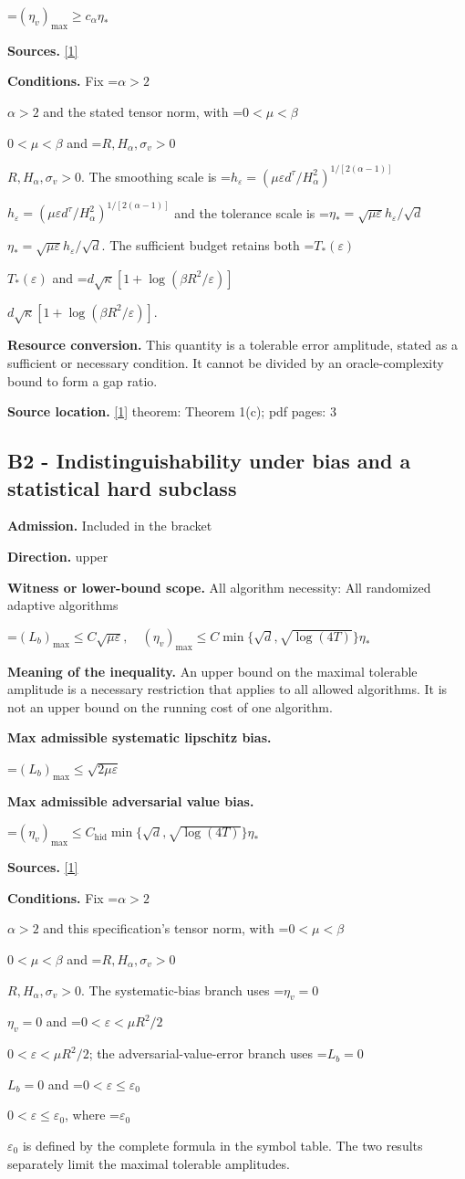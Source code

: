 \documentclass[10pt,a4paper]{article}
\newcommand{\AtlasMath}[1]{\par\begingroup\centering\setbox0=\hbox{$\displaystyle #1$}\ifdim\wd0>1.4\linewidth\typeout{ATLAS WIDE FORMULA: \the\wd0}\fi\ifdim\wd0>\linewidth\resizebox{\linewidth}{!}{\box0}\else\box0\fi\par\endgroup}
\newcommand{\AtlasInlineMath}[1]{\begingroup\setbox0=\hbox{$#1$}\ifdim\wd0>.4\linewidth\endgroup\AtlasMath{#1}\else\endgroup$#1$\fi}
\begin{document}
\AtlasMath{(\eta_v)_{\max}\ge c_\alpha\eta_*}
\textbf{Sources.} \href{https://arxiv.org/pdf/2610.05517v2}{[1]}

\textbf{Conditions.} Fix \AtlasInlineMath{\alpha>2} and the stated tensor norm, with \AtlasInlineMath{0<\mu<\beta} and \AtlasInlineMath{R,H_\alpha,\sigma_v>0}. The smoothing scale is \AtlasInlineMath{h_\varepsilon=(\mu\varepsilon d^\tau/H_\alpha^2)^{1/[2(\alpha-1)]}} and the tolerance scale is \AtlasInlineMath{\eta_*=\sqrt{\mu\varepsilon}h_\varepsilon/\sqrt d}. The sufficient budget retains both \AtlasInlineMath{T_*(\varepsilon)} and \AtlasInlineMath{d\sqrt\kappa[1+\log(\beta R^2/\varepsilon)]}.

\textbf{Resource conversion.} This quantity is a tolerable error amplitude, stated as a sufficient or necessary condition. It cannot be divided by an oracle-complexity bound to form a gap ratio.

\textbf{Source location.} \href{https://arxiv.org/pdf/2610.05517v2}{[1]} theorem: Theorem 1(c); pdf pages: 3

\subsection{B2 - Indistinguishability under bias and a statistical hard subclass}
\textbf{Admission.} Included in the bracket

\textbf{Direction.} upper

\textbf{Witness or lower-bound scope.} All algorithm necessity: All randomized adaptive algorithms

\AtlasMath{(L_b)_{\max}\le C\sqrt{\mu\varepsilon},\quad (\eta_v)_{\max}\le C\min\{\sqrt d,\sqrt{\log(4T)}\}\eta_*}
\textbf{Meaning of the inequality.} An upper bound on the maximal tolerable amplitude is a necessary restriction that applies to all allowed algorithms. It is not an upper bound on the running cost of one algorithm.

\textbf{Max admissible systematic lipschitz bias.}

\AtlasMath{(L_b)_{\max}\le\sqrt{2\mu\varepsilon}}
\textbf{Max admissible adversarial value bias.}

\AtlasMath{(\eta_v)_{\max}\le C_{\mathrm{hid}}\min\{\sqrt d,\sqrt{\log(4T)}\}\eta_*}
\textbf{Sources.} \href{https://arxiv.org/pdf/2610.05517v2}{[1]}

\textbf{Conditions.} Fix \AtlasInlineMath{\alpha>2} and this specification's tensor norm, with \AtlasInlineMath{0<\mu<\beta} and \AtlasInlineMath{R,H_\alpha,\sigma_v>0}. The systematic-bias branch uses \AtlasInlineMath{\eta_v=0} and \AtlasInlineMath{0<\varepsilon<\mu R^2/2}; the adversarial-value-error branch uses \AtlasInlineMath{L_b=0} and \AtlasInlineMath{0<\varepsilon\le\varepsilon_0}, where \AtlasInlineMath{\varepsilon_0} is defined by the complete formula in the symbol table. The two results separately limit the maximal tolerable amplitudes.
\end{document}
